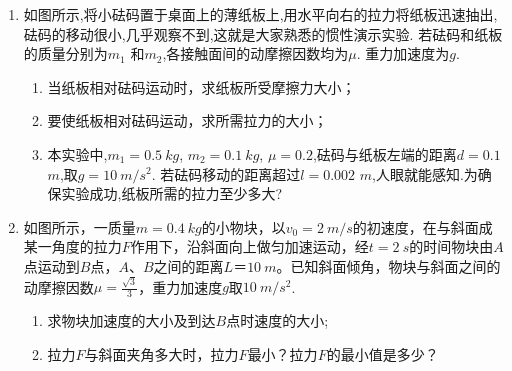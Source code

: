 \begin{enumerate}[leftmargin=0em]
\item 
{}
如图所示,将小砝码置于桌面上的薄纸板上,用水平向右的拉力将纸板迅速抽出, 砝码的移动很小,几乎观察不到,这就是大家熟悉的惯性演示实验. 若砝码和纸板的质量分别为$ m_{1} $ 和$ m_{2} $,各接触面间的动摩擦因数均为$ \mu $. 重力加速度为$ g $.
\begin{enumerate}
\renewcommand{\labelenumi}{\arabic{enumi}.}
\item
当纸板相对砝码运动时，求纸板所受摩擦力大小；
\item 
要使纸板相对砝码运动，求所需拉力的大小；
\item 
本实验中,$ m_{1} =0.5 \ kg $, $ m_{2} =0.1 \ kg $, $ \mu =0.2 $,砝码与纸板左端的距离$ d =0.1 $ $ m $,取$ g =10 \ m/s^{2} $. 若砝码移动的距离超过$ l=0.002 $ $ m $,人眼就能感知.为确保实验成功,纸板所需的拉力至少多大? 

\end{enumerate}
\begin{figure}[h!]
\flushright

\end{figure}



\newpage
\item 
{}
如图所示，一质量$ m=0.4 \ kg $的小物块，以$ v_0=2 \ m/s $的初速度，在与斜面成某一角度的拉力$ F $作用下，沿斜面向上做匀加速运动，经$ t=2\ s $的时间物块由$ A $点运动到$ B $点，$ A $、$ B $之间的距离$ L $＝$ 10 \ m $。已知斜面倾角，物块与斜面之间的动摩擦因数$\mu = \frac { \sqrt { 3 } } { 3 }$，重力加速度$ g $取$ 10 \ m/s^{2} $.
\begin{enumerate}
\renewcommand{\labelenumi}{\arabic{enumi}.}
\item
求物块加速度的大小及到达$ B $点时速度的大小;
\item 
拉力$ F $与斜面夹角多大时，拉力$ F $最小？拉力$ F $的最小值是多少？


\end{enumerate}
\end{enumerate}
